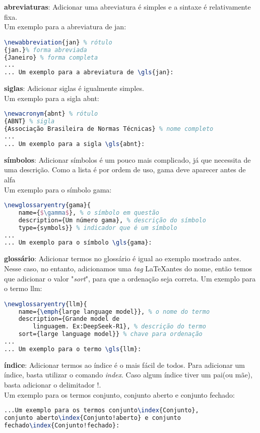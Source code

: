 \begin{alineas}
	\item \textbf{abreviaturas}: Adicionar uma abreviatura é simples e a sintaxe é relativamente fixa.\\ Um exemplo para a abreviatura de \gls{jan}:
		\begin{lstlisting}[language=tex]
\newabbreviation{jan} % rótulo
{jan.}% forma abreviada
{Janeiro} % forma completa
...
... Um exemplo para a abreviatura de \gls{jan}:
		\end{lstlisting}
	
	\item \textbf{siglas}: Adicionar siglas é igualmente simples.\\ 
	Um exemplo para a sigla \gls{abnt}:
	\begin{lstlisting}[language=tex]
\newacronym{abnt} % rótulo
{ABNT} % sigla
{Associação Brasileira de Normas Técnicas} % nome completo
...
... Um exemplo para a sigla \gls{abnt}:
	\end{lstlisting}
	
	\item \textbf{símbolos}: Adicionar símbolos é um pouco mais complicado, já que necessita de uma descrição. Como a lista é por ordem de uso, \gls{gama} deve aparecer antes de \gls{alfa}\\ 
	Um exemplo para o símbolo \gls{gama}:
	\begin{lstlisting}[language=tex]
\newglossaryentry{gama}{
	name={$\gamma$}, % o símbolo em questão
	description={Um número gama}, % descrição do símbolo
	type={symbols}} % indicador que é um símbolo
...
... Um exemplo para o símbolo \gls{gama}:
	\end{lstlisting}
	
	\item \textbf{glossário}: Adicionar termos no glossário é igual ao exemplo mostrado antes.\\
	Nesse caso, no entanto, adicionamos uma \emph{tag} \LaTeX antes do nome, então temos que adicionar o valor "\emph{sort}", para que a ordenação seja correta.
	Um exemplo para o termo \gls{llm}:
	\begin{lstlisting}[language=tex]
\newglossaryentry{llm}{
	name={\emph{large language model}}, % o nome do termo
	description={Grande model de 
		linguagem. Ex:DeepSeek-R1}, % descrição do termo
	sort={large language model}} % chave para ordenação
...
... Um exemplo para o termo \gls{llm}:
	\end{lstlisting}
	
	\item \textbf{índice}: Adicionar termos ao índice é o mais fácil de todos. Para adicionar um índice, basta utilizar o comando \emph{index}. Caso algum índice tiver um pai(ou mãe), basta adicionar o delimitador !.\\
	Um exemplo para os termos conjunto, conjunto aberto e conjunto fechado:
	\begin{lstlisting}[language=tex]
...Um exemplo para os termos conjunto\index{Conjunto},
conjunto aberto\index{Conjunto!aberto} e conjunto 
fechado\index{Conjunto!fechado}:
	\end{lstlisting}
	
\end{alineas}

